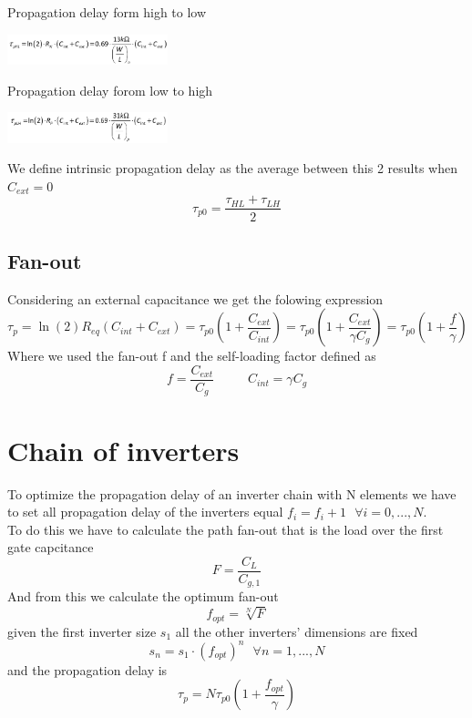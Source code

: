 Propagation delay form high to low

\centering
\includegraphics[width=0.35\textwidth]{C3_11.png}\\
\raggedright

\vspace{5mm}

Propagation delay forom low to high 

\centering
\includegraphics[width=0.35\textwidth]{C3_12.png}\\
\raggedright

\vspace{5mm}
We define intrinsic propagation delay as the average between this 2 results when $C_{ext}=0$
\begin{equation}
\tau_{p0}=\frac{\tau_{HL}+\tau_{LH}}{2}
\end{equation}

\subsection{Fan-out}
Considering an external capacitance we get the folowing expression
\begin{equation}
\tau_p=\ln(2)R_{eq}(C_{int}+C_{ext})=\tau_{p0}\left(1+\frac{C_{ext}}{C_{int}}\right)=\tau_{p0}\left(1+\frac{C_{ext}}{\gamma C_g}\right)=\tau_{p0}\left(1+\frac{f}{\gamma}\right)
\end{equation}
Where we used the fan-out f and the self-loading factor defined as
\begin{equation}
f=\frac{C_{ext}}{C_g}\ \ \ \ \ \ \ \ \ \ \ \ C_{int}=\gamma C_g
\end{equation}

\section{Chain of inverters}

To optimize the propagation delay of an inverter chain with N elements we have to set all propagation delay of the inverters equal $f_i=f_i+1\ \ \  \forall i=0,...,N$.\\
To do this we have to calculate the path fan-out that is the load over the first gate capcitance
\begin{equation}
F=\frac{C_L}{C_{g,1}}
\end{equation} 
And from this we calculate the optimum fan-out 
\begin{equation}
f_{opt}=\sqrt[N]{F}
\end{equation}
given the first inverter size $s_1$ all the other inverters' dimensions are fixed 
\begin{equation}
s_n=s_1\cdot (f_{opt})^{n} \ \ \ \forall n=1,...,N 
\end{equation} 
and the propagation delay is 
\begin{equation}
\tau_p=N\tau_{p0}\left(1+\frac{f_{opt}}{\gamma} \right)
\end{equation}

